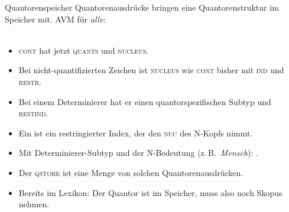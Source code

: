 \begin{frame}
  {Quantorenspeicher}
  \onslide<+->
  \onslide<+->
  Quantorenausdrücke bringen eine Quantorenstruktur \alert{im Speicher} mit. AVM für \textit{alle}:\\
  \onslide<+->
  \Halbzeile
  \centering 
  \\
  \Halbzeile
  \begin{itemize}[<+->]
    \item \textsc{cont} hat jetzt \textsc{quants} und \textsc{nucleus}.
    \item Bei nicht-quantifizierten Zeichen ist \textsc{nucleus} wie \textsc{cont} bisher mit \textsc{ind} und \textsc{restr}.
    \item Bei einem Determinierer hat er einen quantorspezifischen Subtyp und \textsc{restind}.
    \item Ein  ist ein restringierter Index, der den \textsc{nuc} des N-Kopfs nimmt.
    \item Mit Determinierer-Subtyp und der N-Bedeutung (z.\,B.\ \textit{Mensch}): .
    \item Der \alert{\textsc{qstore}} ist eine \alert{Menge} von solchen Quantorenausdrücken.
    \item Bereits im Lexikon: Der Quantor ist im Speicher, muss also noch Skopus nehmen.
  \end{itemize}
\end{frame}

